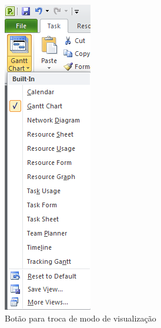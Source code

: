 \begin{figure}[!h]
\centering
\includegraphics[scale=0.55]{Figuras/project_inicio3.png}
\caption{Botão para troca de modo de visualização}
\label{fig:msp:tela3}
\end{figure}
